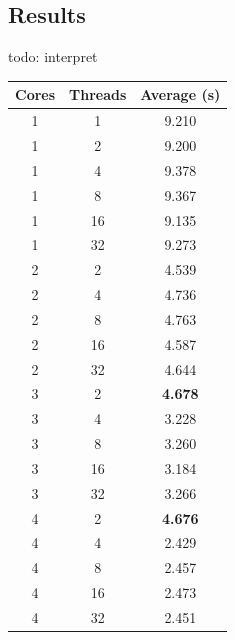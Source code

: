 \documentclass[bsc,frontabs,twoside,singlespacing,parskip,deptreport]{infthesis}     %
\begin{document}
\subsection{Results}
todo: interpret
\begin{table}[h]
\label{timing-infos-mb-mod}
\parbox{.45\linewidth}{
\centering
\scriptsize
\begin{tabular}{ccc}
\toprule
Cores &Threads &Average (s) \\
\midrule
1 &1 &9.210 \\
\midrule
1 &2 &9.200 \\
1 &4 &9.378 \\
1 &8 &9.367 \\
1 &16 &9.135 \\
1 &32 &9.273 \\
\midrule
2 &2 &4.539 \\
2 &4 &4.736 \\
2 &8 &4.763 \\
2 &16 &4.587 \\
2 &32 &4.644 \\
\midrule
3 &2 &\textbf{4.678} \\
3 &4 &3.228 \\
3 &8 &3.260 \\
3 &16 &3.184 \\
3 &32 &3.266 \\
\midrule
4 &2 &\textbf{4.676} \\
4 &4 &2.429 \\
4 &8 &2.457 \\
4 &16 &2.473 \\
4 &32 &2.451 \\
\bottomrule
\end{tabular}

}
\end{table}
\end{document}
